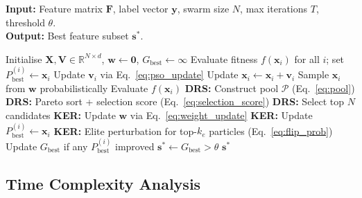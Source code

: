 \documentclass[a4paper,fleqn]{cas-dc}
\begin{document}
\begin{sloppypar}
	\begin{algorithm}[t]
	\caption{KDS-EL: Knowledge-guided Dual-Space Evolutionary Learning}
	\label{alg:kdsel}
	\hspace*{0.02in} {\bf Input:}
	Feature matrix $\mathbf{F}$, label vector $\mathbf{y}$,
	swarm size $N$, max iterations $T$, threshold $\theta$.\\
	\hspace*{0.02in} {\bf Output:}
	Best feature subset $\mathbf{s}^*$.
	\begin{algorithmic}[1]
		\State Initialise $\mathbf{X}, \mathbf{V} \in \mathbb{R}^{N \times d}$,
		$\mathbf{w} \leftarrow \mathbf{0}$,
		$G_{\mathrm{best}} \leftarrow \infty$
		\State Evaluate fitness $f(\mathbf{x}_i)$ for all $i$; set
		$P_{\mathrm{best}}^{(i)} \leftarrow \mathbf{x}_i$
				 
					\State Update $\mathbf{v}_i$ via Eq.~\eqref{eq:pso_update}
					\State Update $\mathbf{x}_i \leftarrow \mathbf{x}_i + \mathbf{v}_i$
				\Else {}
					\State Sample $\mathbf{x}_i$ from $\mathbf{w}$ probabilistically
				\EndIf
				\State Evaluate $f(\mathbf{x}_i)$
			\EndFor
			\State \textbf{DRS:} Construct pool $\mathcal{P}$ (Eq.~\eqref{eq:pool})
			\State \textbf{DRS:} Pareto sort + selection score (Eq.~\eqref{eq:selection_score})
			\State \textbf{DRS:} Select top $N$ candidates
				\State \textbf{KER:} Update $\mathbf{w}$ via Eq.~\eqref{eq:weight_update}
				\State \textbf{KER:} Update $P_{\mathrm{best}}^{(i)} \leftarrow \mathbf{x}_i$
			\EndFor
			\State \textbf{KER:} Elite perturbation for top-$k_e$ particles (Eq.~\eqref{eq:flip_prob})
			\State Update $G_{\mathrm{best}}$ if any $P_{\mathrm{best}}^{(i)}$ improved
		\EndFor
		\State $\mathbf{s}^* \leftarrow G_{\mathrm{best}} > \theta$
		\State \Return $\mathbf{s}^*$
	\end{algorithmic}
	\end{algorithm}


	\subsection{Time Complexity Analysis}
	\label{sec:method:complexity}


\end{sloppypar}
\end{document}
